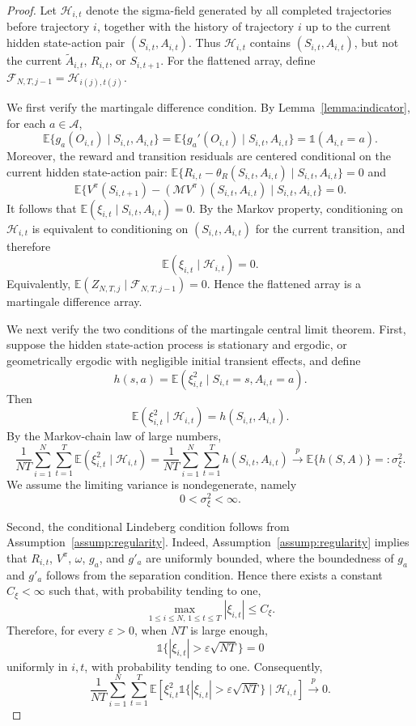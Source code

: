 \documentclass[12pt]{article}
\newcommand{\0}{\boldsymbol{0}}
\begin{document}
\begin{proof}
Let \(\mathcal H_{i,t}\) denote the sigma-field generated by all completed trajectories before trajectory \(i\), together with the history of trajectory \(i\) up to the current hidden state-action pair \((S_{i,t},A_{i,t})\). Thus \(\mathcal H_{i,t}\) contains \((S_{i,t},A_{i,t})\), but not the current \(\widetilde A_{i,t}\), \(R_{i,t}\), or \(S_{i,t+1}\). For the flattened array, define \(\mathcal F_{N,T,j-1}=\mathcal H_{i(j),t(j)}\).

We first verify the martingale difference condition. By Lemma~\ref{lemma:indicator}, for each \(a\in\mathcal A\),
\[
\mathbb E\{g_a(O_{i,t})\mid S_{i,t},A_{i,t}\}=\mathbb E\{g_a'(O_{i,t})\mid S_{i,t},A_{i,t}\}=\mathds 1(A_{i,t}=a).
\]
Moreover, the reward and transition residuals are centered conditional on the
current hidden state-action pair: \(\mathbb E\{R_{i,t}-\theta_R(S_{i,t},A_{i,t})
\mid S_{i,t},A_{i,t}\}=0\) and
\[
\mathbb E\{V^\pi(S_{i,t+1})-(\mathcal M V^\pi)(S_{i,t},A_{i,t})\mid S_{i,t},A_{i,t}\}=0.
\]
It follows that \(\mathbb E(\xi_{i,t}\mid S_{i,t},A_{i,t})=0\). By the Markov property, conditioning on \(\mathcal H_{i,t}\) is equivalent to conditioning on
\((S_{i,t},A_{i,t})\) for the current transition, and therefore
\[
\mathbb E(\xi_{i,t}\mid \mathcal H_{i,t})=0.
\]
Equivalently, \(\mathbb E(Z_{N,T,j}\mid \mathcal F_{N,T,j-1})=0\). Hence the flattened array is a martingale difference array.

We next verify the two conditions of the martingale central limit theorem. First, suppose the hidden state-action process is stationary and ergodic, or geometrically ergodic with negligible initial transient effects, and define
\[
h(s,a)=\mathbb E(\xi_{i,t}^2\mid S_{i,t}=s,A_{i,t}=a).
\]
Then
\[
\mathbb E(\xi_{i,t}^2\mid \mathcal H_{i,t})=h(S_{i,t},A_{i,t}).
\]
By the Markov-chain law of large numbers,
\[
\frac{1}{NT}\sum_{i=1}^N\sum_{t=1}^T\mathbb E(\xi_{i,t}^2\mid \mathcal H_{i,t})
=\frac{1}{NT}\sum_{i=1}^N\sum_{t=1}^Th(S_{i,t},A_{i,t})
\xrightarrow{p}\mathbb E\{h(S,A)\}=:\sigma_\xi^2.
\]
We assume the limiting variance is nondegenerate, namely
\[
0<\sigma_\xi^2<\infty.
\]

Second, the conditional Lindeberg condition follows from Assumption~\ref{assump:regularity}. Indeed, Assumption~\ref{assump:regularity} implies that \(R_{i,t}\), \(V^\pi\), \(\omega\), \(g_a\), and \(g'_a\) are uniformly bounded, where the boundedness of \(g_a\) and \(g'_a\) follows from the separation condition. Hence there exists a constant \(C_\xi<\infty\) such that, with probability tending to one,
\[
\max_{1\le i\le N,\,1\le t\le T}|\xi_{i,t}|\le C_\xi .
\]
Therefore, for every \(\varepsilon>0\), when \(NT\) is large enough,
\[
\mathds 1\{|\xi_{i,t}|>\varepsilon\sqrt{NT}\}=0
\]
uniformly in \(i,t\), with probability tending to one. Consequently,
\[
\frac{1}{NT}\sum_{i=1}^N\sum_{t=1}^T\mathbb E\left[\xi_{i,t}^2
\mathds 1\{|\xi_{i,t}|>\varepsilon\sqrt{NT}\}\mid \mathcal H_{i,t}\right]\xrightarrow{p}0.
\]



\end{proof}
\end{document}
